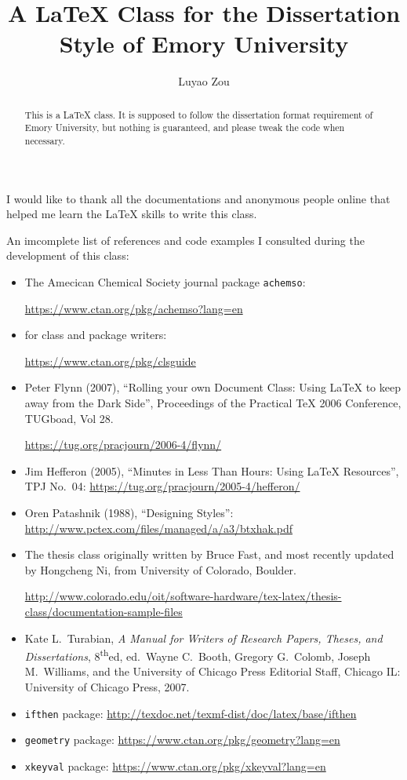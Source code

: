 \documentclass[draft]{emory}
\title{A \LaTeX{} Class for the Dissertation Style of Emory University}
\author{Luyao Zou}                      %
\begin{document}
\begin{abstract}

This is a \LaTeX{} class. It is supposed to follow the dissertation format
requirement of Emory University, but nothing is guaranteed, and please tweak the
code when necessary. 

\end{abstract}

\begin{acknowledgement}%

I would like to thank all the documentations and anonymous people online that
helped me learn the \LaTeX{} skills to write this class. 

An imcomplete list of references and code examples I consulted during the development
of this class:
\begin{itemize}
  \item The Amecican Chemical Society journal package \Verb|achemso|:
  
        \url{https://www.ctan.org/pkg/achemso?lang=en}
  \item \LaTeXe{} for class and package writers:
        
        \url{https://www.ctan.org/pkg/clsguide}
  \item Peter Flynn (2007), ``Rolling your own Document Class: Using \LaTeX{} to keep away from the Dark Side'', Proceedings of the Practical \TeX{} 2006 Conference, TUGboad, Vol 28.
        
        \url{https://tug.org/pracjourn/2006-4/flynn/}
  \item Jim Hefferon (2005), ``Minutes in Less Than Hours: Using \LaTeX{} Resources'', TPJ No.~04: 
        \url{https://tug.org/pracjourn/2005-4/hefferon/} 
  \item Oren Patashnik (1988), ``Designing \BibTeX{} Styles'':
        \url{http://www.pctex.com/files/managed/a/a3/btxhak.pdf}
  \item The thesis class originally written by Bruce Fast, and most recently updated by Hongcheng Ni, from University of Colorado, Boulder. 
        
        \url{http://www.colorado.edu/oit/software-hardware/tex-latex/thesis-class/documentation-sample-files}
  \item Kate L.\ Turabian, \textit{A Manual for Writers of Research Papers, Theses, and 
  Dissertations}, 8\textsuperscript{th}ed, ed.\ Wayne C.\ Booth, Gregory G.\ Colomb, Joseph M.\ Williams, and the University of Chicago Press Editorial Staff,  Chicago IL: University of Chicago Press, 2007.
  \item \Verb|ifthen| package: \url{http://texdoc.net/texmf-dist/doc/latex/base/ifthen}
  \item \Verb|geometry| package: \url{https://www.ctan.org/pkg/geometry?lang=en}
  \item \Verb|xkeyval| package: \url{https://www.ctan.org/pkg/xkeyval?lang=en}
\end{itemize}


\end{acknowledgement}
\end{document}

